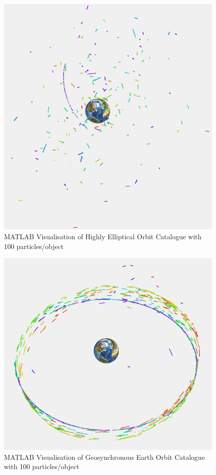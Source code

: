 \documentclass[12pt,openany,a4paper]{book}
\begin{document}
			\begin{figure}[H]
				\centering
				\caption{MATLAB Visualisation of Highly Elliptical Orbit Catalogue with 100 particles/object}
				\label{cHEO}
				\includegraphics[scale=0.5]{c100HEO.png}
			\end{figure}
			
			\begin{figure}[H]
				\centering
				\caption{MATLAB Visualisation of Geosynchronous Earth Orbit Catalogue with 100 particles/object}
				\label{cGEO}
				\includegraphics[scale=0.5]{p100GEO.png}
			\end{figure}
			
\end{document}
